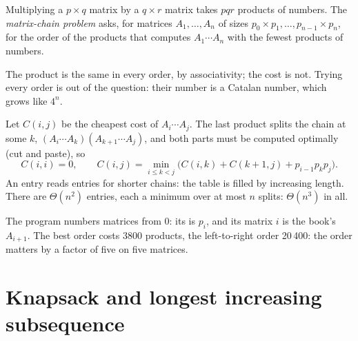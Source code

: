 \begin{definition}\label{def:b1:dynamic-programming:chain}
Multiplying a $p \times q$ matrix by a $q \times r$ matrix takes $pqr$ products of numbers. The \emph{matrix-chain
problem} asks, for matrices $A_1, \dots, A_n$ of sizes $p_0 \times p_1, \dots, p_{n-1}
\times p_n$, for the order of the products that computes $A_1 \cdots A_n$ with the fewest products of numbers.
\end{definition}

The product is the same in every order, by associativity; the cost is not. Trying every order is out of the question:
their number is a Catalan number, which grows like $4^n$.

\label{out:b1:dynamic-programming:catalan}

Let $C(i, j)$ be the cheapest cost of $A_i \cdots A_j$. The last product splits the chain at some $k$, $(A_i \cdots
A_k)(A_{k+1} \cdots A_j)$, and both parts must be computed optimally (cut and paste), so
\[ C(i, i) = 0, \qquad C(i, j) = \min_{i \leq k < j} \bigl(C(i, k) + C(k + 1, j) + p_{i-1} p_k p_j\bigr). \]
An entry reads entries for shorter chains: the table is filled by increasing length. There are $\Theta(n^2)$ entries,
each a minimum over at most $n$ splits: $\Theta(n^3)$ in all.

\label{lst:b1:dynamic-programming:chain}

\label{out:b1:dynamic-programming:chain}

The program numbers matrices from 0: its  is $p_i$, and its matrix $i$ is the book's $A_{i+1}$. The best order costs 3800 products, the left-to-right order 20\,400: the order matters by a factor
of five on five matrices.

\section{Knapsack and longest increasing subsequence}\label{sec:b1:dynamic-programming:knapsack}

